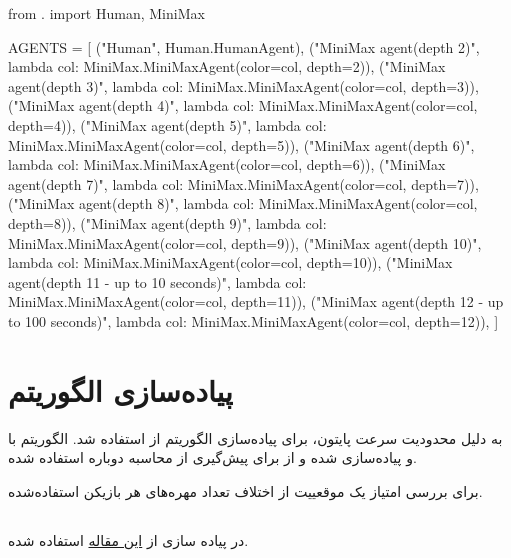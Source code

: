 \begin{latin}
\begin{python}
from . import Human, MiniMax


AGENTS = [
        ("Human", Human.HumanAgent), 
        ("MiniMax agent(depth 2)", lambda col: MiniMax.MiniMaxAgent(color=col,
            depth=2)),
        ("MiniMax agent(depth 3)", lambda col: MiniMax.MiniMaxAgent(color=col,
            depth=3)),
        ("MiniMax agent(depth 4)", lambda col: MiniMax.MiniMaxAgent(color=col,
            depth=4)),
        ("MiniMax agent(depth 5)", lambda col: MiniMax.MiniMaxAgent(color=col,
            depth=5)),
        ("MiniMax agent(depth 6)", lambda col: MiniMax.MiniMaxAgent(color=col,
            depth=6)),
        ("MiniMax agent(depth 7)", lambda col: MiniMax.MiniMaxAgent(color=col,
            depth=7)),
        ("MiniMax agent(depth 8)", lambda col: MiniMax.MiniMaxAgent(color=col,
            depth=8)),
        ("MiniMax agent(depth 9)", lambda col: MiniMax.MiniMaxAgent(color=col,
            depth=9)),
        ("MiniMax agent(depth 10)", lambda col: MiniMax.MiniMaxAgent(color=col,
            depth=10)),
        ("MiniMax agent(depth 11 - up to 10 seconds)", lambda col: MiniMax.MiniMaxAgent(color=col,
            depth=11)),
        ("MiniMax agent(depth 12 - up to 100 seconds)", lambda col: MiniMax.MiniMaxAgent(color=col,
            depth=12)),
        ]

\end{python}
\end{latin}


\chapter{پیاده‌سازی الگوریتم }
به دلیل محدودیت سرعت پایتون، برای پیاده‌سازی الگوریتم
از 
استفاده شد.
الگوریتم با 
و
پیاده‌سازی شده
و از 
برای پیش‌گیری از محاسبه دوباره استفاده شده.

برای بررسی امتیاز یک موقعییت از اختلاف تعداد مهره‌های هر بازیکن استفاده‌شده.

\section{}
در پیاده سازی 
از
\href{https://www.geeksforgeeks.org/minimax-algorithm-in-game-theory-set-5-zobrist-hashing/}{این مقاله}
استفاده شده.


